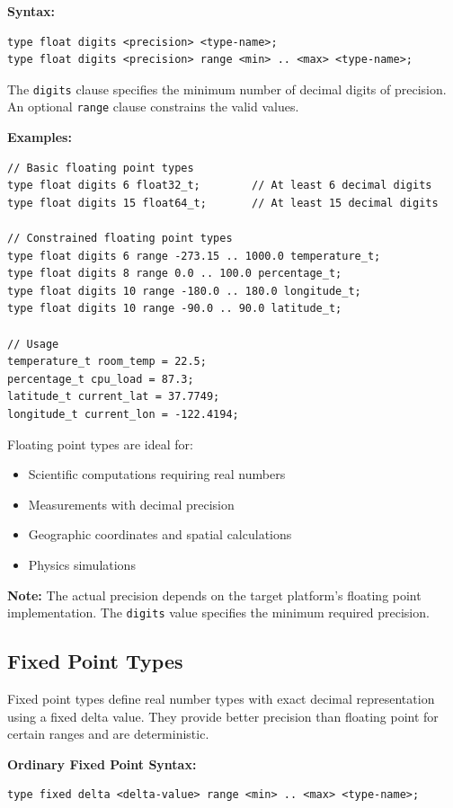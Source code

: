 \documentclass[11pt,letterpaper,twoside,openany]{book}
\begin{document}
\textbf{Syntax:}
\begin{lstlisting}
type float digits <precision> <type-name>;
type float digits <precision> range <min> .. <max> <type-name>;
\end{lstlisting}

The \verb'digits' clause specifies the minimum number of decimal digits of precision. An optional \verb'range' clause constrains the valid values.

\textbf{Examples:}
\begin{lstlisting}
// Basic floating point types
type float digits 6 float32_t;        // At least 6 decimal digits
type float digits 15 float64_t;       // At least 15 decimal digits

// Constrained floating point types
type float digits 6 range -273.15 .. 1000.0 temperature_t;
type float digits 8 range 0.0 .. 100.0 percentage_t;
type float digits 10 range -180.0 .. 180.0 longitude_t;
type float digits 10 range -90.0 .. 90.0 latitude_t;

// Usage
temperature_t room_temp = 22.5;
percentage_t cpu_load = 87.3;
latitude_t current_lat = 37.7749;
longitude_t current_lon = -122.4194;
\end{lstlisting}

Floating point types are ideal for:
\begin{itemize}
\item Scientific computations requiring real numbers
\item Measurements with decimal precision
\item Geographic coordinates and spatial calculations
\item Physics simulations
\end{itemize}

\textbf{Note:} The actual precision depends on the target platform's floating point implementation. The \verb'digits' value specifies the minimum required precision.

\subsection{Fixed Point Types}

Fixed point types define real number types with exact decimal representation using a fixed delta value. They provide better precision than floating point for certain ranges and are deterministic.

\textbf{Ordinary Fixed Point Syntax:}
\begin{lstlisting}
type fixed delta <delta-value> range <min> .. <max> <type-name>;
\end{lstlisting}
\end{document}
